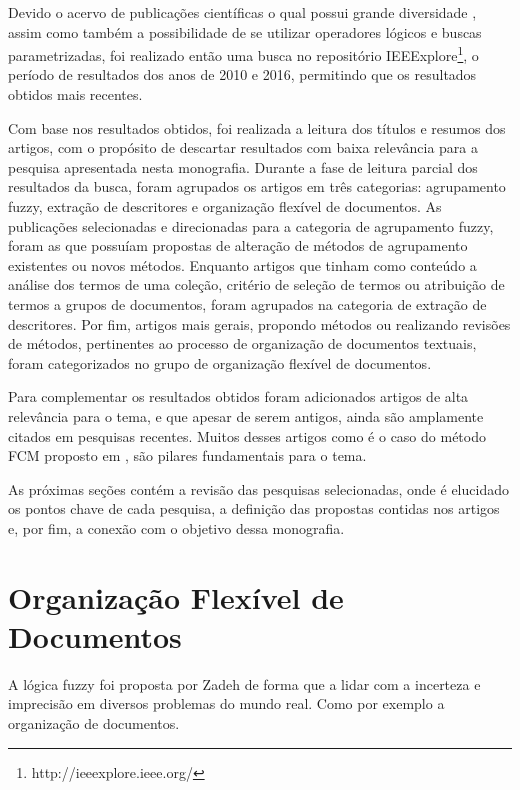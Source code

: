 Devido o acervo de publicações científicas o qual possui grande diversidade
, assim como também a possibilidade de se utilizar
operadores lógicos e buscas parametrizadas, foi realizado então uma busca no repositório IEEExplore\footnote{http://ieeexplore.ieee.org/},
o período de resultados dos anos de 2010 e 2016, permitindo que os
resultados obtidos mais recentes.

Com base nos resultados obtidos, foi realizada a leitura dos títulos e resumos dos artigos, com o
propósito de descartar resultados com baixa relevância para a pesquisa apresentada nesta monografia.  Durante a fase de
leitura parcial dos resultados da busca, foram agrupados os artigos em três categorias: agrupamento
fuzzy, extração de descritores e organização flexível de documentos.  As publicações selecionadas e
direcionadas para a categoria de agrupamento fuzzy, foram as que possuíam propostas de alteração de
métodos de agrupamento existentes ou novos métodos. Enquanto artigos que tinham como conteúdo a
análise dos termos de uma coleção, critério de seleção de termos ou atribuição de termos a grupos de
documentos, foram agrupados na categoria de extração de descritores. Por fim, artigos mais gerais,
propondo métodos ou realizando revisões de métodos, pertinentes ao processo de organização de
documentos textuais, foram categorizados no grupo de organização flexível de documentos.

Para complementar os resultados obtidos foram adicionados artigos de alta relevância para o tema, e
que apesar de serem antigos, ainda são amplamente citados em pesquisas recentes. Muitos desses
artigos como é o caso do método FCM proposto em \cite{Bezdek1984}, são pilares fundamentais para o
tema.

As próximas seções contém a revisão das pesquisas selecionadas, onde é elucidado os pontos chave
de cada pesquisa, a definição das propostas contidas nos artigos e, por fim, a conexão com o objetivo
dessa monografia.

\section{Organização Flexível de Documentos}

A lógica fuzzy foi proposta por Zadeh \cite{Zadeh1965} de forma que a lidar com a incerteza e imprecisão em
diversos problemas do mundo real. Como por exemplo a organização de
documentos.

